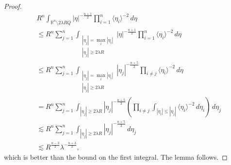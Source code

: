 \documentclass[10pt]{amsart}
\newcommand{\la}{\lambda}
\newcommand{\e}{\varepsilon}
\newcommand{\R}{{\mathbb R}}
\newcommand{\1}{\mathbb{1}}
\begin{document}
\begin{proof}
\begin{align*}
    &R^n \int_{\R^n \setminus 2\lambda R Q} |\eta|^{-\frac{n+1}{2}} \prod_{i = 1}^n \langle \eta_i \rangle^{-2} \, d\eta \\
    &\leq R^n \sum_{j = 1}^n \int_{\substack{|\eta_j| = \max_i |\eta_i| \\ |\eta_j| \geq 2\lambda R}} |\eta|^{-\frac{n+1}{2}} \prod_{i = 1}^n \langle \eta_i \rangle^{-2} \, d\eta \\
    &\leq R^n \sum_{j = 1}^n \int_{\substack{|\eta_j| = \max_i |\eta_i| \\ |\eta_j| \geq 2\lambda R}} |\eta_j|^{-\frac{n+5}{2}} \prod_{i \neq j} \langle \eta_i \rangle^{-2} \, d\eta \\
    &= R^n \sum_{j = 1}^n \int_{|\eta_j| \geq 2\lambda R} |\eta_j|^{-\frac{n+5}{2}} \left( \prod_{i \neq j} \int_{|\eta_i| \leq |\eta_j|} \langle \eta_i \rangle^{-2} \, d\eta_i \right) \, d\eta_j\\
    &\lesssim R^n \sum_{j = 1}^n \int_{|\eta_j| \geq 2\lambda R} |\eta_j|^{-\frac{n+5}{2}} \, d\eta_j \\
    &\lesssim R^{\frac{n-3}{2}} \lambda^{-\frac{n+3}{2}},
\end{align*}
which is better than the bound on the first integral. The lemma follows.
\end{proof}










































\newpage



\end{document}
